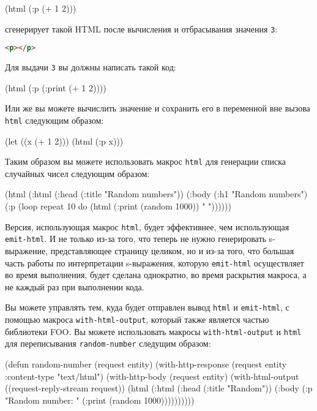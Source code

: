 \begin{myverb}
  (html (:p (+ 1 2)))
\end{myverb}

\noindent{}сгенерирует такой HTML после вычисления и отбрасывания значения \lstinline{3}:

\begin{lstlisting}[language=HTML]
  <p></p>
\end{lstlisting}

Для выдачи \lstinline{3} вы должны написать такой код:

\begin{myverb}
  (html (:p (:print (+ 1 2))))
\end{myverb}

Или же вы можете вычислить значение и сохранить его в переменной вне вызова \lstinline{html}
следующим образом:

\begin{myverb}
(let ((x (+ 1 2))) (html (:p x)))
\end{myverb}

Таким образом вы можете использовать макрос \lstinline{html} для генерации списка случайных
чисел следующим образом:

\begin{myverb}
  (html
    (:html
      (:head
        (:title "Random numbers"))
      (:body 
        (:h1 "Random numbers")
        (:p (loop repeat 10 do (html (:print (random 1000)) " "))))))
\end{myverb}

Версия, использующая макрос \lstinline{html}, будет эффективнее, чем использующая
\lstinline{emit-html}. И не только из-за того, что теперь не нужно генерировать s-выражение,
представляющее страницу целиком, но и из-за того, что большая часть работы по
интерпретации s-выражения, которую \lstinline{emit-html} осуществляет во время выполнения,
будет сделана однократно, во время раскрытия макроса, а не каждый раз при выполнении кода.

Вы можете управлять тем, куда будет отправлен вывод \lstinline{html} и \lstinline{emit-html}, с
помощью макроса \lstinline{with-html-output}, который также является частью библиотеки
FOO. Вы можете использовать макросы \lstinline{with-html-output} и \lstinline{html} для
переписывания \lstinline{random-number} следущим образом:

\begin{myverb}
  (defun random-number (request entity)
    (with-http-response (request entity :content-type "text/html")
      (with-http-body (request entity)
        (with-html-output ((request-reply-stream request))
          (html
            (:html
              (:head (:title "Random"))
              (:body
                (:p "Random number: " (:print (random 1000))))))))))
\end{myverb}

